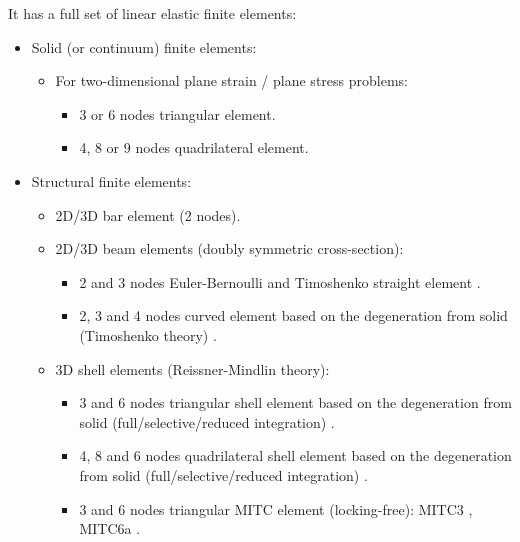 \documentclass[a4paper,fleqn]{book}
\begin{document}
It has a full set of linear elastic finite elements: 
\begin{itemize}
    \item Solid (or continuum) finite elements:
    \begin{itemize}
        \item For two-dimensional plane strain / plane stress problems:
        \begin{itemize}
            \item 3 or 6 nodes triangular element.
            \item 4, 8 or 9 nodes quadrilateral element.
        \end{itemize}
    \end{itemize}
    \item Structural finite elements:
    \begin{itemize}
        \item 2D/3D bar element (2 nodes).
        \item 2D/3D beam elements (doubly symmetric cross-section):
        \begin{itemize}
            \item 2 and 3 nodes Euler-Bernoulli and Timoshenko straight element \cite{onate2013,friedman1993}.
            \item 2, 3 and 4 nodes curved element based on the degeneration from solid (Timoshenko theory) \cite{bathe1996}.
        \end{itemize}
        \item 3D shell elements (Reissner-Mindlin theory):
        \begin{itemize}
            \item 3 and 6 nodes triangular shell element based on the degeneration from solid (full/selective/reduced integration) \cite{onate2013}.
            \item 4, 8 and 6 nodes quadrilateral shell element based on the degeneration from solid (full/selective/reduced integration) \cite{onate2013}.
            \item 3 and 6 nodes triangular MITC element (locking-free): MITC3 \cite{lee2004}, MITC6a \cite{lee2004}.

\end{itemize}
\end{itemize}
\end{itemize}
\end{document}
